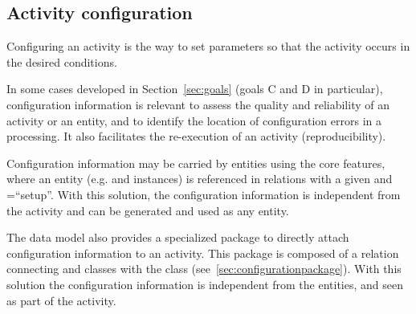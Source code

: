
\subsection{Activity configuration}
\label{sec:configuration}

Configuring an activity is the way to set parameters so that the activity occurs in the desired conditions.

In some cases developed in Section~\ref{sec:goals} (goals C and D in particular), configuration information is relevant to assess the quality and reliability of an activity or an entity, and to identify the location of configuration errors in a processing. It also facilitates the re-execution of an activity (reproducibility).

Configuration information may be carried by entities using the core features, where an entity (e.g.  and  instances) is referenced in  relations with a given  and =“setup”. With this solution, the configuration information is independent from the activity and can be generated and used as any entity.

The data model also provides a specialized  package to directly attach configuration information to an activity. This package is composed of a  relation connecting   and  classes with the  class (see~\ref{sec:configurationpackage}). With this solution the configuration information is independent from the entities, and seen as part of the activity.







